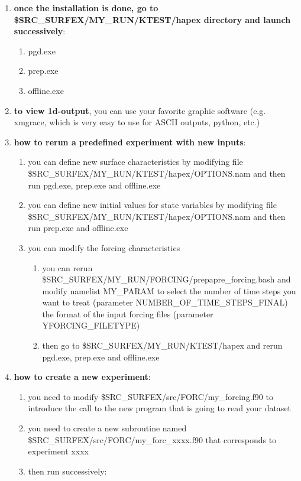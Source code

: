 \begin{enumerate}
\begin{enumerate}
			\item {\bf{once the installation is done, go to \$SRC\_SURFEX/MY\_RUN/KTEST/hapex directory and launch successively}}:
				\begin{enumerate}
					\item pgd.exe
					\item prep.exe
					\item offline.exe
				\end{enumerate}
			\item {\bf{to view 1d-output}}, you can use your favorite graphic software (e.g. xmgrace, which is very easy to use for ASCII outputs, python, etc.)
			\item {\bf{how to rerun a predefined experiment with new inputs}}:
				\begin{enumerate}
					\item you can define new surface characteristics by modifying file \\
						\$SRC\_SURFEX/MY\_RUN/KTEST/hapex/OPTIONS.nam and then run pgd.exe, prep.exe and offline.exe
					\item you can define new initial values for state variables by modifying file \\
						\$SRC\_SURFEX/MY\_RUN/KTEST/hapex/OPTIONS.nam and then run prep.exe and offline.exe
					\item you can modify the forcing characteristics
						\begin{enumerate}
							\item you can rerun \$SRC\_SURFEX/MY\_RUN/FORCING/prepapre\_forcing.bash and modify namelist MY\_PARAM to select the number of time steps you want to treat (parameter NUMBER\_OF\_TIME\_STEPS\_FINAL) the format of the input forcing files (parameter YFORCING\_FILETYPE)
							\item then go to \$SRC\_SURFEX/MY\_RUN/KTEST/hapex and rerun pgd.exe, prep.exe and offline.exe
						\end{enumerate}
				\end{enumerate}
			\item {\bf{how to create a new experiment}}:
				\begin{enumerate}
					\item you need to modify \$SRC\_SURFEX/src/FORC/my\_forcing.f90 to introduce the call to the new program that is going to read your dataset 
					\item you need to create a new subroutine named \$SRC\_SURFEX/src/FORC/my\_forc\_xxxx.f90 that corresponds to experiment xxxx
					\item then run successively:

\end{enumerate}
\end{enumerate}
\end{enumerate}
